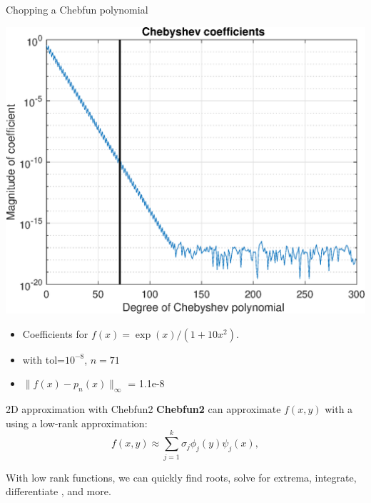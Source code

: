 \documentclass{beamer}
\begin{document}
\begin{frame}{Chopping a Chebfun polynomial}
\begin{center}
\includegraphics[scale = 0.4]{Cheb8.eps}
\end{center}

\begin{center}
\begin{itemize}
\item \begin{center} Coefficients for $f(x)=\exp(x)/(1+10 x^2)$. \end{center}
\item \begin{center} with tol=$10^{-8}$, $n=71$ \end{center}
\item \begin{center} $\| f(x)-p_n(x) \|_{\infty}$ = 1.1e-8 \end{center}
\end{itemize}
\end{center}
\end{frame}

\begin{frame}{2D approximation with Chebfun2}
	\textbf{Chebfun2} can approximate $f(x,y)$ with a using a low-rank approximation:
	$$
	f(x,y) \approx \sum_{j=1}^{k} \sigma_j \phi_j(y) \psi_j(x),
	$$	

	With low rank functions, we can quickly find roots, solve for extrema, integrate, differentiate , and more.

\end{frame}
\end{document}
